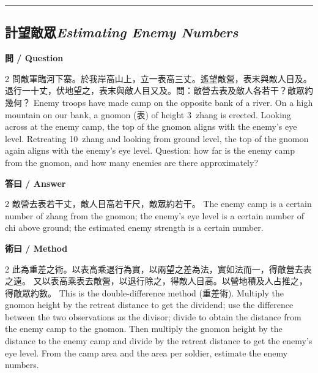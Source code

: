 \documentclass[11pt,a4paper]{article}
\newcommand{\bilingualsubsection}[2]{\subsection{#1\quad\textit{#2}}}
\newcommand{\longline}{\noindent\rule{\textwidth}{0.4pt}}
\begin{document}
\vspace{0.5em}
\longline

\bilingualsubsection{計望敵眾}{Estimating Enemy Numbers}

\vspace{0.4em}
\noindent\textbf{\textcolor{chinesecolor}{問} / \textcolor{englishcolor}{Question}}
\vspace{0.3em}
\begin{paracol}{2}
問敵軍臨河下寨。於我岸高山上，立一表高三丈。遙望敵營，表末與敵人目及。
退行一十丈，伏地望之，表末與敵人目又及。問：敵營去表及敵人各若干？敵眾約幾何？
\switchcolumn
Enemy troops have made camp on the opposite bank of a river. On a high
mountain on our bank, a gnomon (表) of height 3~zhang is erected. Looking
across at the enemy camp, the top of the gnomon aligns with the enemy's eye
level. Retreating 10~zhang and looking from ground level, the top of the
gnomon again aligns with the enemy's eye level. Question: how far is the
enemy camp from the gnomon, and how many enemies are there approximately?
\end{paracol}

\vspace{0.4em}
\noindent\textbf{\textcolor{chinesecolor}{答曰} / \textcolor{englishcolor}{Answer}}
\vspace{0.2em}
\begin{paracol}{2}
敵營去表若干丈，敵人目高若干尺，敵眾約若干。
\switchcolumn
The enemy camp is a certain number of zhang from the gnomon; the enemy's eye
level is a certain number of chi above ground; the estimated enemy strength
is a certain number.
\end{paracol}

\vspace{0.4em}
\noindent\textbf{\textcolor{chinesecolor}{術曰} / \textcolor{englishcolor}{Method}}
\vspace{0.2em}
\begin{paracol}{2}
此為重差之術。以表高乘退行為實，以兩望之差為法，實如法而一，得敵營去表之遠。
又以表高乘表去敵營，以退行除之，得敵人目高。以營地積及人占推之，得敵眾約數。
\switchcolumn
This is the double-difference method (重差術). Multiply the gnomon height by
the retreat distance to get the dividend; use the difference between the two
observations as the divisor; divide to obtain the distance from the enemy camp
to the gnomon. Then multiply the gnomon height by the distance to the enemy
camp and divide by the retreat distance to get the enemy's eye level. From
the camp area and the area per soldier, estimate the enemy numbers.
\end{paracol}
\end{document}
